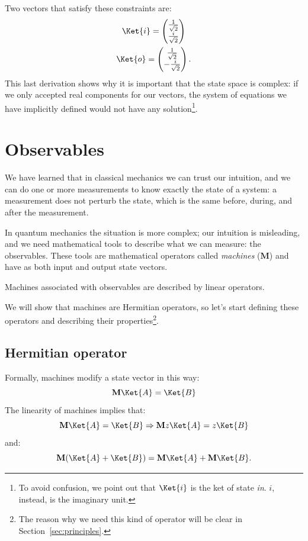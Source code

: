 Two vectors that satisfy these constraints are:
\begin{gather}
	\Ket{i} = \begin{pmatrix}
		\frac{1}{\sqrt{2}} \\
		\frac{i}{\sqrt{2}}
	\end{pmatrix}
	\label{eqn:ket_i}\\
	\Ket{o} = \begin{pmatrix}
		\frac{1}{\sqrt{2}} \\
		-\frac{i}{\sqrt{2}}
	\end{pmatrix}.
	\label{eqn:ket_o}
\end{gather}
This last derivation shows why it is important that the state space is complex: if we only accepted real components for our vectors, the system of equations we have implicitly defined would not have any solution\footnote{To avoid confusion, we point out that $\Ket{i}$ is the ket of state \emph{in}. $i$, instead, is the imaginary unit.}.

\section{Observables}
We have learned that in classical mechanics we can trust our intuition, and we can do one or more measurements to know exactly the state of a system: a measurement does not perturb the state, which is the same before, during, and after the measurement.

In quantum mechanics the situation is more complex; our intuition is misleading, and we need mathematical tools to describe what we can measure: the observables. These tools are mathematical operators called \emph{machines} ($\mathbf{M}$) and have as both input and output state vectors.

\begin{axiom}
	Machines associated with observables are described by linear operators.
\end{axiom}

We will show that machines are Hermitian operators, so let's start defining these operators and describing their properties\footnote{The reason why we need this kind of operator will be clear in Section~\ref{sec:principles}.}.

\subsection{Hermitian operator}
\noindent Formally, machines modify a state vector in this way:
\[
\mathbf{M} \Ket{A} = \Ket{B}
\]
The linearity of machines implies that:
\[
\mathbf{M} \Ket{A} = \Ket{B} \Rightarrow \mathbf{M} z\Ket{A} = z\Ket{B}
\]
and:
\[
\mathbf{M}(\Ket{A}+\Ket{B}) = \mathbf{M}\Ket{A} + \mathbf{M}\Ket{B}.
\]

